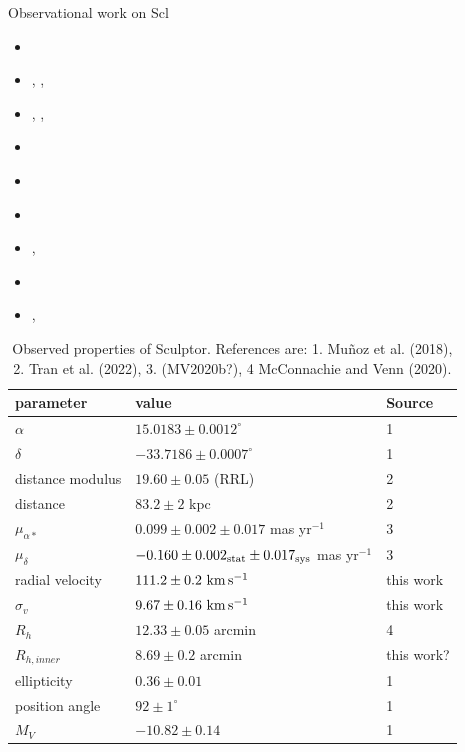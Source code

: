 Observational work on Scl

\begin{itemize}
\tightlist
\item
  \citet{sestito+2023a}
\item
  \citet{tolstoy+2023}, \citet{arroyo-polonio+2023},
  \citet{arroyo-polonio+2024}
\item
  \citet{eskridge1988}, \citet{eskridge1988a}, \citet{eskridge1988b}
\item
  \citet{coleman+dacosta+bland-hawthorn2005}
\item
  \citet{DQ1994}
\item
  \citet{WMO2009}
\item
  \citet{IH1995}, \citet{munoz+2018}
\item
  \citet{kirby+2009}
\item
  \citet{martinez-vazquez+2015}, \citet{pietrzynski+2008}
\end{itemize}

\begin{table}[t]
\centering
\caption{Observed properties of Sculptor. References are: 1. Muñoz et al. (2018), 2. Tran et al. (2022), 3. (MV2020b?), 4 McConnachie and Venn (2020).}
\label{tbl:Observed-properties-of-Sculptor-References-are:-1-Muñoz-et-al-2018-2-Tran-et-al-2022-3-MV2020b?-4-McConnachie-and-Venn-2020}
\begin{tabular}{lll}
\toprule
parameter & value & Source\\
\midrule
$\alpha$ & $15.0183 \pm 0.0012^\circ$ & 1\\
$\delta$ & $-33.7186 \pm 0.0007^\circ$ & 1\\
distance modulus & $19.60 \pm 0.05$ (RRL) & 2\\
distance & $83.2 \pm 2$ kpc & 2\\
$\mu_{\alpha*}$ & $0.099 \pm 0.002 \pm 0.017$ mas yr$^{-1}$ & 3\\
$\mu_\delta$ & $-0.160 \pm 0.002_{\rm stat} \pm 0.017_{\rm sys}$ mas yr$^{-1}$ & 3\\
radial velocity & $111.2 \pm 0.2\ {\rm km\,s^{-1}}$ & this work\\
$\sigma_v$ & $9.67\pm0.16\ {\rm km\,s^{-1}}$ & this work\\
$R_h$ & $12.33 \pm 0.05$ arcmin & 4\\
$R_{h,inner}$ & $8.69 \pm 0.2$ arcmin & this work?\\
ellipticity & $0.36 \pm 0.01$ & 1\\
position angle & $92\pm1^\circ$ & 1\\
$M_V$ & $-10.82\pm0.14$ & 1\\
\bottomrule
\end{tabular}
\end{table}

